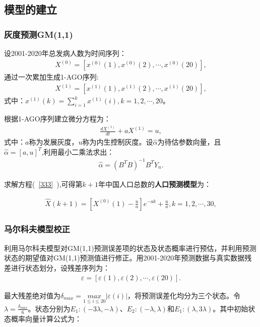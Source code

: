 \documentclass{whutmod}
\begin{document}
		\subsection{模型的建立}
		\subsubsection{灰度预测GM(1,1)}
		设2001-2020年总发病人数为时间序列：
		\begin{gather*}
		X^{(0)}=[x^{(0)}(1),x^{(0)}(2),\cdots,x^{(0)}(20)],
		\end{gather*}
		通过一次累加生成1-AGO序列:
		\begin{gather*}
		X^{(1)}=[x^{(1)}(1),x^{(1)}(2),\cdots,x^{(1)}(20)],
		\end{gather*}
		式中：$x^{(1)}(k)=\sum_{i=1}^{k}x^{(1)}(i),k=1,2,\cdots,20$。
		
		根据1-AGO序列建立微分方程为：
		\begin{gather}\label{333}
		\frac{d X^{(1)}}{dt}+a X^{(1)} = u,
		\end{gather}
		式中：$a$称为发展灰度，$u$称为内生控制灰度。设$\widehat{\alpha}$为待估参数向量，且$\widehat{\alpha }=[a,u]^T$,利用最小二乘法求出：
		\begin{gather*}
		\widehat{\alpha }=(B^TB)^{-1}B^{T}Y_{n}.
		\end{gather*}
		
		
		求解方程(~\ref{333}~),可得第$k+1$年中国人口总数的\textbf{人口预测模型}为：
		
		\begin{gather}
		\widehat{X}(k+1)=[X^{(0)}(1)-\frac{u}{a}]e^{-ak}+\frac{u}{a},k=1,2,\cdots,30,
		\end{gather}
	
		\subsubsection{马尔科夫模型校正}
		利用马尔科夫模型对GM(1,1)预测误差项的状态及状态概率进行预估，并利用预测状态的期望值对GM(1,1)预测值进行修正。用2001-2020年预测数据与真实数据残差进行状态划分，设残差序列为：
		\begin{gather*}
		\varepsilon =[\varepsilon(1) ,\varepsilon(2), \cdots,\varepsilon(20)].
		\end{gather*}
		
		最大残差绝对值为$\delta _{max}=\underset{1\leqslant i\leqslant20 }{max}\left | \varepsilon(i) \right |$，将预测误差化均分为三个状态。令$\lambda =\frac{\delta _{max}}{6}$。状态分别为$E_{1}:(-3\lambda,-\lambda)$、$E_{2}:(-\lambda,\lambda)$和$E_{1}:(\lambda,3\lambda)$。其中初始状态概率向量计算公式为：
		
\end{document}

